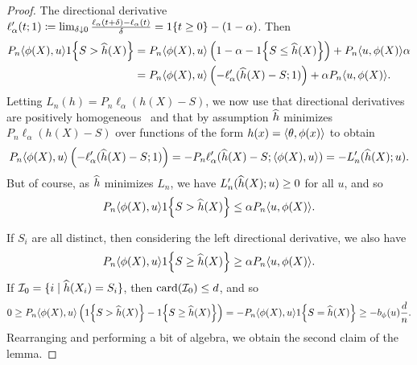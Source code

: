 \documentclass[11pt]{article}
\newcommand{\radphi}{b_{\phi}}
\newcommand{\loss}{\ell}
\newcommand{\scorerv}{S}
\begin{document}
\begin{proof}
  The directional derivative
  $\loss'_\alpha(t; 1) \defeq \lim_{\delta \downarrow 0}
  \frac{\loss_\alpha(t + \delta) - \loss_\alpha(t)}{\delta}
  = \indic{t \ge 0} - (1 - \alpha)$.
  Then
  \begin{align*}
    P_n \<\phi(X), u\> \indic{\scorerv > \what{h}(X)}
    & = P_n\<\phi(X), u\>
    \left(1 - \alpha
    - \indic{\scorerv \le \what{h}(X)}\right)
    + P_n \<u, \phi(X)\> \alpha \\
    & = 
    P_n \<\phi(X), u\>
    \left(-\loss'_\alpha(\what{h}(X) - \scorerv; 1)\right)
    + \alpha P_n\<u, \phi(X)\>.
  \end{align*}
  Letting $L_n(h) = P_n \loss_\alpha(h(X) - \scorerv)$, we now use that
  directional derivatives are positively homogeneous~\cite{HiriartUrrutyLe93}
  and that by assumption $\widehat{h}$ minimizes
  $P_n \loss_\alpha(h(X) - \scorerv)$ over
  functions of the form $h(x) = \langle\theta, \phi(x)\rangle$ to obtain
  \begin{equation*}
    P_n \<\phi(X), u\>
    \left(-\loss'_\alpha(\what{h}(X) - \scorerv; 1)\right)
    = - P_n\loss'_\alpha(\what{h}(X) - \scorerv; \<\phi(X), u\>)
    = - L_n'(\what{h}(X); u).
  \end{equation*}
  But of course, as $\widehat{h}$ minimizes $L_n$,
  we have $L_n'(\widehat{h}(X); u) \ge 0$ for all $u$, and so
  \begin{equation*}
    P_n\<\phi(X), u\> \indic{\scorerv > \what{h}(X)}
    \le \alpha P_n \<u, \phi(X)\>.
  \end{equation*}

  If $\scorerv_i$ are all distinct, then considering the
  left directional derivative, we also have
  \begin{align*}
    P_n\<\phi(X), u\> \indic{\scorerv \ge \what{h}(X)} \ge
    \alpha P_n \<u, \phi(X)\>.
  \end{align*}
  If $\mc{I}_0 = \{i \mid \what{h}(X_i) = \scorerv_i\}$,
  then $\mathop{\rm card}(\mathcal{I}_0) \le d$, and so
  \begin{equation*}
    0 \ge P_n \<\phi(X), u\>
    \left(\indic{\scorerv > \what{h}(X)}
    - \indic{\scorerv \ge \what{h}(X)}\right)
    = -P_n \<\phi(X), u\> \indic{\scorerv = \what{h}(X)}
    \ge -\radphi(u) \frac{d}{n}.
  \end{equation*}
  Rearranging and performing a bit of algebra, we
  obtain the second claim of the lemma.
\end{proof}
\end{document}

